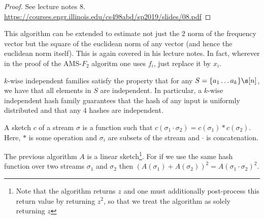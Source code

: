 \documentclass[../main.tex]{subfiles}
\begin{document}
\begin{proof}
    See lecture notes 8.
    \url{https://courses.engr.illinois.edu/cs498abd/sp2019/slides/08.pdf}
\end{proof}

\begin{remark}
    This algorithm can be extended to estimate not just the $2$ norm of the frequency vector but the square of the euclidean norm of any vector (and hence the euclidean norm itself). This is again covered in his lecture notes. In fact, wherever in the proof of the AMS-$F_2$ algoritm one uses $f_i$, just replace it by $x_i$.
\end{remark}

\begin{remark}
    $k$-wise independent families satisfy the property that for any $S = \{a_1 \dots a_k\} \s [n]$, we have that all elements in $S$ are independent. In particular, a $k$-wise independent hash family guarantees that the hash of any input is uniformly distributed and that any $4$ hashes are independent.
\end{remark}

\begin{definition}
    A sketch $c$ of a stream $\sigma$ is a function such that
    $c(\sigma_1 \cdot \sigma_2) = c(\sigma_1) * c(\sigma_2)$. Here, $*$ is some operation and $\sigma_i$ are subsets of the stream and $\cdot$ is concatenation.
\end{definition}

\begin{remark}
    The previous algorithm $A$ is a linear sketch\footnote{Note that the algorithm returns $z$ and one must additionally post-process this return value by returning $z^2$, so that we treat the algorithm as solely returning $z$}. For if we use the same hash function over two streams $\sigma_1$ and $\sigma_2$ then $(A(\sigma_1) + A(\sigma_2))^2 = A(\sigma_1 \cdot \sigma_2)^2$.
\end{remark}
\end{document}

